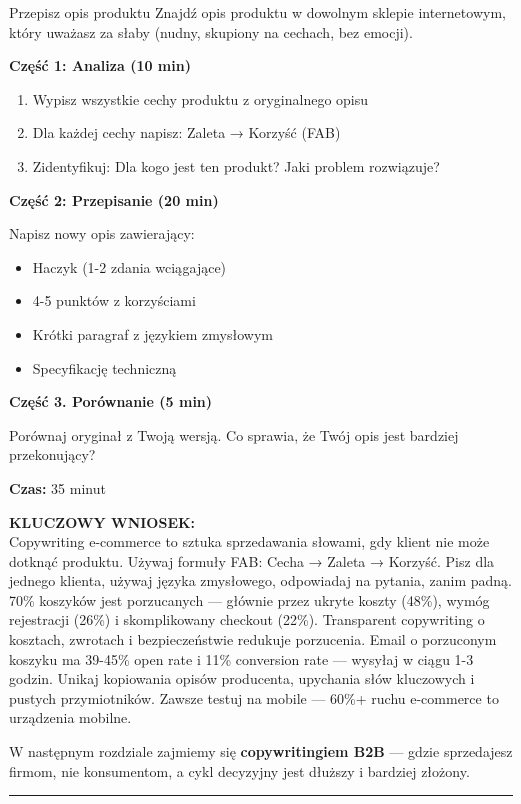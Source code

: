 \documentclass[
  12pt,
  a4paper,
  twoside,
  openright,
  12pt,
  DIV=12,
  BCOR=12mm]{scrbook}
\newcommand{\decoline}{%
  \begin{center}
    \textcolor{bordergray}{\rule{0.3\textwidth}{0.5pt}}
  \end{center}
}
\newcommand{\takeaway}[1]{%
  \begin{tcolorbox}[
    enhanced,
    colback=accentgreen!10,
    colframe=accentgreen,
    boxrule=0pt,
    borderline south={3pt}{0pt}{accentgreen},
    sharp corners,
    left=15pt, right=15pt, top=10pt, bottom=10pt
  ]
    \textbf{\color{accentgreen}KLUCZOWY WNIOSEK:}\\[5pt]
    #1
  \end{tcolorbox}
}
\begin{document}
\begin{cwiczenie}{Przepisz opis produktu}
Znajdź opis produktu w dowolnym sklepie internetowym, który uważasz za słaby (nudny, skupiony na cechach, bez emocji).

\textbf{Część 1: Analiza (10 min)}
\begin{enumerate}
  \item Wypisz wszystkie cechy produktu z oryginalnego opisu
  \item Dla każdej cechy napisz: Zaleta → Korzyść (FAB)
  \item Zidentyfikuj: Dla kogo jest ten produkt? Jaki problem rozwiązuje?
\end{enumerate}

\textbf{Część 2: Przepisanie (20 min)}

Napisz nowy opis zawierający:
\begin{itemize}
  \item Haczyk (1-2 zdania wciągające)
  \item 4-5 punktów z korzyściami
  \item Krótki paragraf z językiem zmysłowym
  \item Specyfikację techniczną
\end{itemize}

\textbf{Część 3. Porównanie (5 min)}

Porównaj oryginał z Twoją wersją. Co sprawia, że Twój opis jest bardziej przekonujący?

\textbf{Czas:} 35 minut
\end{cwiczenie}

\takeaway{Copywriting e-commerce to sztuka sprzedawania słowami, gdy klient nie może dotknąć produktu. Używaj formuły FAB: Cecha → Zaleta → Korzyść. Pisz dla jednego klienta, używaj języka zmysłowego, odpowiadaj na pytania, zanim padną. 70\% koszyków jest porzucanych --- głównie przez ukryte koszty (48\%), wymóg rejestracji (26\%) i skomplikowany checkout (22\%). Transparent copywriting o kosztach, zwrotach i bezpieczeństwie redukuje porzucenia. Email o porzuconym koszyku ma 39-45\% open rate i 11\% conversion rate --- wysyłaj w ciągu 1-3 godzin. Unikaj kopiowania opisów producenta, upychania słów kluczowych i pustych przymiotników. Zawsze testuj na mobile --- 60\%+ ruchu e-commerce to urządzenia mobilne.}

W następnym rozdziale zajmiemy się \textbf{copywritingiem B2B} --- gdzie
sprzedajesz firmom, nie konsumentom, a cykl decyzyjny jest dłuższy i
bardziej złożony.

\decoline
\end{document}
